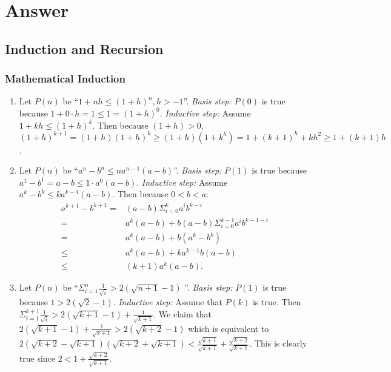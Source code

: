 \documentclass{../../cls/sig-alternate-05-2015}
\begin{document}
\nocite{*}

 
\clearpage
\appendix
\section{Answer}
\subsection{Induction and Recursion}
\subsubsection{Mathematical Induction}
\begin{enumerate}
\item Let $P(n)$ be \textquotedblleft $1 + nh \le (1 + h)^n, h > -1$\textquotedblright.
\textit{Basis step:} $P(0)$ is true because $1 + 0 \cdot h = 1 \le 1 = (1 + h)^0$.
\textit{Inductive step:} Assume $1 + kh \le (1 + h)^k$. Then because
$(1+h) > 0$, $(1 + h)^{k + 1} = (1 + h)(1 + h)^k \ge (1 + h)(1 + k^h) = 1 + (k + 1)^h + kh^2 \ge 1 + (k + 1)h$.
	
\item Let $P(n)$ be \textquotedblleft $a^n - b^n \le na^{n - 1}(a - b)$\textquotedblright. \textit{Basis step:} $P(1)$ is true because $a^1 - b^1 = a - b \le 1 \cdot a^0 (a - b)$. \textit{Inductive step:} Assume $a^k - b^k \le k a^{k - 1}(a - b)$. Then because $0 < b < a$: \begin{align}
	a^{k + 1} - b^{k + 1} = & (a - b)\Sigma_{i = 0}^k a^i b^{k - i}\\
	= & a^k(a - b) + b(a - b) \Sigma_{i = 0}^{k - 1} a^i b^{k - 1 - i}\\
	= & a^k(a - b) + b(a^k - b^k)\\
	\le & a^k(a - b) + k a^{k - 1} b(a - b)\\
	\le & (k + 1) a^k (a - b).
\end{align}

\item Let $P(n)$ be \textquotedblleft $\Sigma_{i = 1}^n \frac{1}{\sqrt{i}} > 2(\sqrt{n + 1} - 1)$ \textquotedblright. \textit{Basis step:} $P(1)$ is true because $1 > 2(\sqrt{2} - 1)$. \textit{Inductive step:} Assume that $P(k)$ is true. Then $\Sigma_{i = 1}^{k + 1} \frac{1}{\sqrt{i}} > 2(\sqrt{k + 1} - 1) + \frac{1}{\sqrt{k + 1}}$. We claim that $2(\sqrt{k + 1} - 1) + \frac{1}{\sqrt{k + 1}} > 2(\sqrt{k + 2} - 1)$ which is equivalent to $2(\sqrt{k + 2} - \sqrt{k + 1}) (\sqrt{k + 2} + \sqrt{k + 1}) < \frac{\sqrt{k + 1}}{\sqrt{k + 1}} + \frac{\sqrt{k + 2}}{\sqrt{k + 1}}$. This is clearly true since $2 < 1 + \frac{\sqrt{k + 2}}{\sqrt{k + 1}}$.
\end{enumerate}
\end{document}
